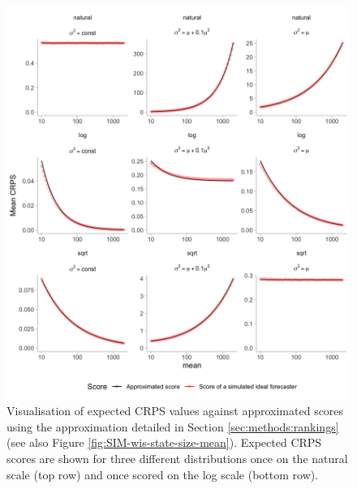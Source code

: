\documentclass{article}
\begin{document}
\begin{figure}[h!]
\centering
\includegraphics[width = 1\textwidth]{output/figures/SIM-score-approximation.png}
\caption{
Visualisation of expected CRPS values against approximated scores using the approximation detailed in Section \ref{sec:methods:rankings} (see also Figure \ref{fig:SIM-wis-state-size-mean}). Expected CRPS scores are shown for three different distributions once on the natural scale (top row) and once scored on the log scale (bottom row).  
}
\label{fig:score-approx}
\end{figure}










\end{document}
